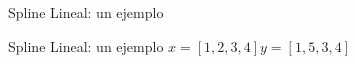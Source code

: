 \documentclass[xcolor=svgnames]{beamer} %
\theoremstyle{plain}
\theoremstyle{definition}
\begin{document}
\begin{frame}{Spline Lineal: un ejemplo}
\begin{minipage}{.5\linewidth}
  \end{minipage} \begin{minipage}{.45\linewidth}
  \end{minipage}

\end{frame}

\begin{frame}{Spline Lineal: un ejemplo}
  $x= [1, 2, 3, 4]$\hspace{10pt}$y=[1, 5, 3, 4]$ 
  

\end{frame}
\end{document}
